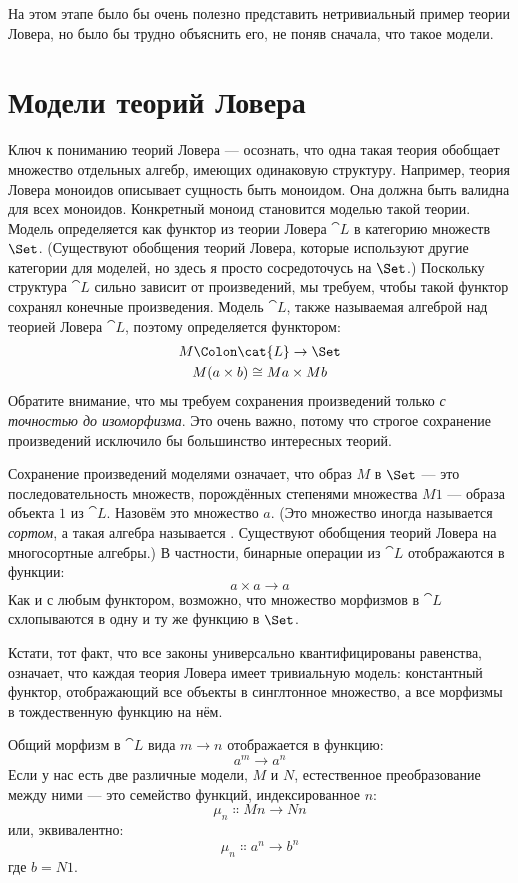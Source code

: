 На этом этапе было бы очень полезно представить нетривиальный пример
теории Ловера, но было бы трудно объяснить его, не поняв сначала,
что такое модели.

\section{Модели теорий Ловера}

Ключ к пониманию теорий Ловера — осознать, что одна такая
теория обобщает множество отдельных алгебр, имеющих одинаковую
структуру. Например, теория Ловера моноидов описывает
сущность быть моноидом. Она должна быть валидна для всех моноидов.
Конкретный моноид становится моделью такой теории. Модель определяется
как функтор из теории Ловера $\cat{L}$ в категорию множеств
$\Set$. (Существуют обобщения теорий Ловера, которые используют
другие категории для моделей, но здесь я просто сосредоточусь на
$\Set$.) Поскольку структура $\cat{L}$ сильно зависит от
произведений, мы требуем, чтобы такой функтор сохранял конечные произведения.
Модель $\cat{L}$, также называемая алгеброй над теорией Ловера
$\cat{L}$, поэтому определяется функтором:
\begin{gather*}
  M \Colon \cat{L} \to \Set \\
  M (a \times b) \cong M a \times M b
\end{gather*}
Обратите внимание, что мы требуем сохранения произведений только \emph{с точностью до
  изоморфизма}. Это очень важно, потому что строгое сохранение
произведений исключило бы большинство интересных теорий.

Сохранение произведений моделями означает, что образ
$M$ в $\Set$ — это последовательность множеств, порождённых степенями
множества $M 1$ --- образа объекта $1$ из
$\cat{L}$. Назовём это множество $a$. (Это множество иногда
называется \emph{сортом}, а такая алгебра называется . Существуют
обобщения теорий Ловера на многосортные алгебры.) В
частности, бинарные операции из $\cat{L}$ отображаются в функции:
\[a \times a \to a\]
Как и с любым функтором, возможно, что множество морфизмов в $\cat{L}$
схлопываются в одну и ту же функцию в $\Set$.

Кстати, тот факт, что все законы универсально квантифицированы
равенства, означает, что каждая теория Ловера имеет тривиальную модель:
константный функтор, отображающий все объекты в синглтонное множество, а все морфизмы
в тождественную функцию на нём.

Общий морфизм в $\cat{L}$ вида
$m \to n$ отображается в функцию:
\[a^m \to a^n\]
Если у нас есть две различные модели, $M$ и $N$, естественное
преобразование между ними — это семейство функций, индексированное
$n$:
\[\mu_n \Colon M n \to N n\]
или, эквивалентно:
\[\mu_n \Colon a^n \to b^n\]
где $b = N 1$.

